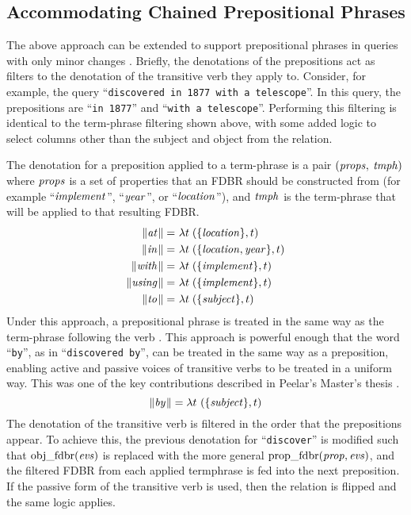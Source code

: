 \documentclass[../main.tex]{subfiles}
\begin{document}
\begin{refsection}
\subsection{Accommodating Chained Prepositional Phrases}

The above approach can be extended to support prepositional phrases in queries with only minor changes \cite{peelar2016accommodating, frost2013event}. Briefly, the denotations of the prepositions act as filters to the denotation of the transitive verb they apply to.  Consider, for example, the query ``\texttt{discovered in 1877 with a telescope}''.  In this query, the prepositions are ``\texttt{in 1877}'' and ``\texttt{with a telescope}''.  Performing this filtering is identical to the term-phrase filtering shown above, with some added logic to select columns other than the subject and object from the relation.

The denotation for a preposition applied to a term-phrase is a pair  $(\operatorname{\mathit{props}},$ $\operatorname{\mathit{tmph}})$ where $\operatorname{\mathit{props}}$ is a set of properties that an FDBR should be constructed from (for example ``$\operatorname{\mathit{implement}}$'', ``$\operatorname{\mathit{year}}$'', or ``$\operatorname{\mathit{location}}$''), and $\operatorname{\mathit{tmph}}$ is the term-phrase that will be applied to that resulting FDBR.
\begin{equation*}
	\begin{split}
		\lVert\textit{at\hspace{0.1em}}\rVert =&\ \lambda t\;(\{\operatorname{\mathit{location}}\}, t) \\
		\lVert\textit{in\hspace{0.1em}}\rVert =&\ \lambda t\;(\{{\operatorname{\mathit{location}}}, {\operatorname{\mathit{year}}}\}, t) \\
		\lVert\textit{with\hspace{0.1em}}\rVert =&\ \lambda t\;(\{\operatorname{\mathit{implement}}\}, t) \\
		\lVert\textit{using\hspace{0.1em}}\rVert =&\ \lambda t\;(\{\operatorname{\mathit{implement}}\}, t) \\
		\lVert\textit{to\hspace{0.1em}}\rVert =&\ \lambda t\;(\{\operatorname{\mathit{subject}}\}, t)
	\end{split}
\end{equation*}
Under this approach, a prepositional phrase is treated in the same way as the term-phrase following the verb \cite{peelar2016accommodating}.
This approach is powerful enough that the word ``\texttt{by}'', as in ``\texttt{discovered by}'', can be treated in the same way as a preposition, enabling active and passive voices of transitive verbs to be treated in a uniform way.  This was one of the key contributions described in Peelar's Master's thesis \cite{peelar2016accommodating}.
\[
\lVert\textit{by\hspace{0.1em}}\rVert = \lambda t\ (\{\operatorname{\mathit{subject}}\}, t)
\]
The denotation of the transitive verb is filtered in the order that the prepositions appear.  To achieve this, the previous denotation for ``\texttt{discover}'' is modified such that $\operatorname{obj\_fdbr}({\operatorname{\mathit{evs}}})$ is replaced with the more general $\operatorname{prop\_fdbr}({\operatorname{\mathit{prop}}}, {\operatorname{\mathit{evs}}})$, and the filtered FDBR from each applied termphrase is fed into the next preposition.  If the passive form of the transitive verb is used, then the relation is flipped and the same logic applies.


\end{refsection}
\end{document}
